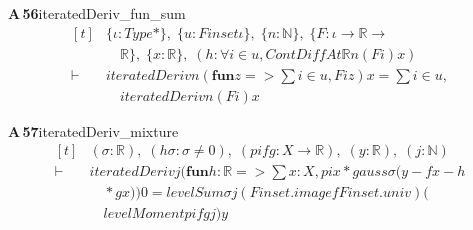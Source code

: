 \documentclass[conference]{IEEEtran}
\theoremstyle{definition}
\newcommand{\lean}[1]{\textsf{\footnotesize #1}}
\begin{document}
\noindent\textbf{A\,56}\quad\lean{iteratedDeriv\_fun\_sum}
{\footnotesize\[ \begin{aligned}[t]
&\{ \iota : \mathit{Type}*\},\; \{ \mathit{u} : \mathit{Finset} \iota \},\; \{ \mathit{n} : \mathbb{N} \},\; \{ \mathit{F} : \iota \to \mathbb{R} \to\\
&\quad \mathbb{R} \},\; \{ \mathit{x} : \mathbb{R} \},\; (\mathit{h} : \forall \mathit{i} \in \mathit{u}, \mathit{ContDiffAt} \mathbb{R} \mathit{n} (\mathit{F} \mathit{i}) \mathit{x})\\
\vdash\;&\mathit{iteratedDeriv} \mathit{n} (\mathbf{fun} \mathit{z} => \textstyle\sum \mathit{i} \in \mathit{u}, \mathit{F} \mathit{i} \mathit{z}) \mathit{x} = \textstyle\sum \mathit{i} \in \mathit{u},\\
&\quad \mathit{iteratedDeriv} \mathit{n} (\mathit{F} \mathit{i}) \mathit{x}
\end{aligned} \]}

\noindent\textbf{A\,57}\quad\lean{iteratedDeriv\_mixture}
{\footnotesize\[ \begin{aligned}[t]
&(\sigma : \mathbb{R} ),\; (\mathit{hσ} : \sigma \neq 0),\; (\mathit{pi} \mathit{f} \mathit{g} : \mathit{X} \to \mathbb{R} ),\; (\mathit{y} : \mathbb{R} ),\; (\mathit{j} : \mathbb{N} )\\
\vdash\;&\mathit{iteratedDeriv} \mathit{j} (\mathbf{fun} \mathit{h} : \mathbb{R} => \textstyle\sum \mathit{x} : \mathit{X}, \mathit{pi} \mathit{x} * \mathit{gauss} \sigma (\mathit{y} - \mathit{f} \mathit{x} - \mathit{h}\\
&\quad * \mathit{g} \mathit{x})) 0 = \mathit{levelSum} \sigma \mathit{j} (\mathit{Finset}.\mathit{image} \mathit{f} \mathit{Finset}.\mathit{univ}) (\\
&\quad \mathit{levelMoment} \mathit{pi} \mathit{f} \mathit{g} \mathit{j}) \mathit{y}
\end{aligned} \]}
\end{document}
